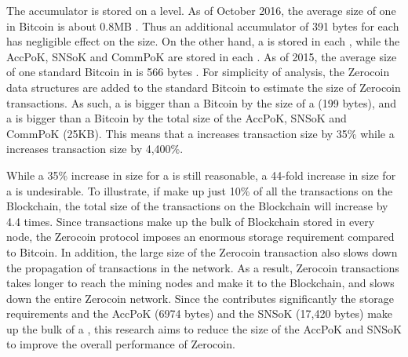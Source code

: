 The accumulator is stored on a \kwBlock{} level. As of October 2016, the average size of one \kwBlock{} in Bitcoin is about 0.8MB \cite{Blockchain.info2016}. Thus an additional accumulator of 391 bytes for each \kwBlock{} has negligible effect on the \kwBlock{} size. On the other hand, a \kwCoin{} is stored in each , while the AccPoK, SNSoK and CommPoK are stored in each . As of 2015, the average size of one standard Bitcoin \kwTransaction{}{} in is 566 bytes \cite{TradeBlock2015}. For simplicity of analysis, the Zerocoin data structures are added to the standard Bitcoin \kwTransaction{}{} to estimate the size of Zerocoin transactions. As such, a  is bigger than a Bitcoin \kwTransaction{}{} by the size of a \kwCoin{} (199 bytes), and a  is bigger than a Bitcoin \kwTransaction{}{} by the total size of the AccPoK, SNSoK and CommPoK (25KB). This means that a  increases transaction size by 35\% while a  increases transaction size by 4,400\%. 

While a 35\% increase in size for a  is still reasonable, a 44-fold increase in size for a  is undesirable. To illustrate, if  make up just 10\% of all the transactions on the Blockchain, the total size of the transactions on the Blockchain will increase by 4.4 times. Since transactions make up the bulk of Blockchain stored in every node, the Zerocoin protocol imposes an enormous storage requirement compared to Bitcoin. In addition, the large size of the Zerocoin transaction also slows down the propagation of transactions in the network. As a result, Zerocoin transactions takes longer to reach the mining nodes and make it to the Blockchain, and slows down the entire Zerocoin network. Since the  contributes significantly the storage requirements and the AccPoK (6974 bytes) and the SNSoK (17,420 bytes) make up the bulk of a , this research aims to reduce the size of the AccPoK and SNSoK to improve the overall performance of Zerocoin.

